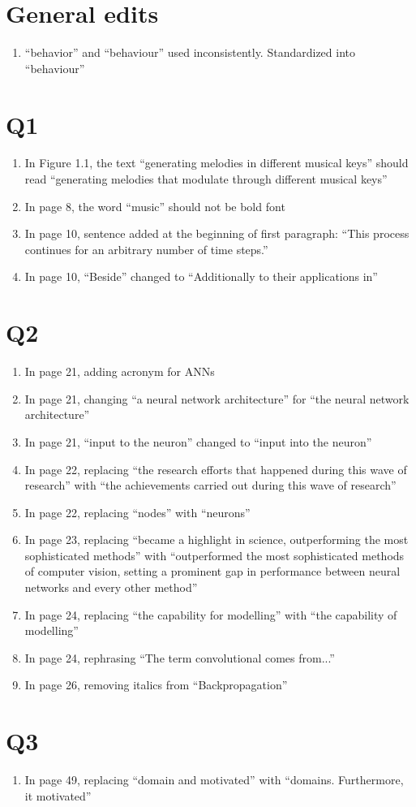 \section{General edits}
\begin{enumerate}
    \item ``behavior'' and ``behaviour'' used inconsistently. Standardized into ``behaviour''
\end{enumerate}

\section{Q1}
\begin{enumerate}
    \item In Figure 1.1, the text ``generating melodies in different musical keys'' should read ``generating melodies that modulate through different musical keys''
    \item In page 8, the word ``music'' should not be bold font
    \item In page 10, sentence added at the beginning of first paragraph: ``This process continues for an arbitrary number of time steps.''
    \item In page 10, ``Beside'' changed to ``Additionally to their applications in''
\end{enumerate}
\section{Q2}
\begin{enumerate}
    \item In page 21, adding acronym for ANNs
    \item In page 21, changing ``a neural network architecture'' for ``the neural network architecture''
    \item In page 21, ``input to the neuron'' changed to ``input into the neuron''
    \item In page 22, replacing ``the research efforts that happened during this wave of research'' with ``the achievements carried out during this wave of research''
    \item In page 22, replacing ``nodes'' with ``neurons''
    \item In page 23, replacing ``became a highlight in science, outperforming the most sophisticated methods'' with ``outperformed the most sophisticated methods of computer vision, setting a prominent gap in performance between neural networks and every other method''
    \item In page 24, replacing ``the capability for modelling'' with ``the capability of modelling''
    \item In page 24, rephrasing ``The term convolutional comes from...''
    \item In page 26, removing italics from ``Backpropagation''
\end{enumerate}
\section{Q3}
\begin{enumerate}
    \item In page 49, replacing ``domain and motivated'' with ``domains. Furthermore, it motivated''
\end{enumerate}